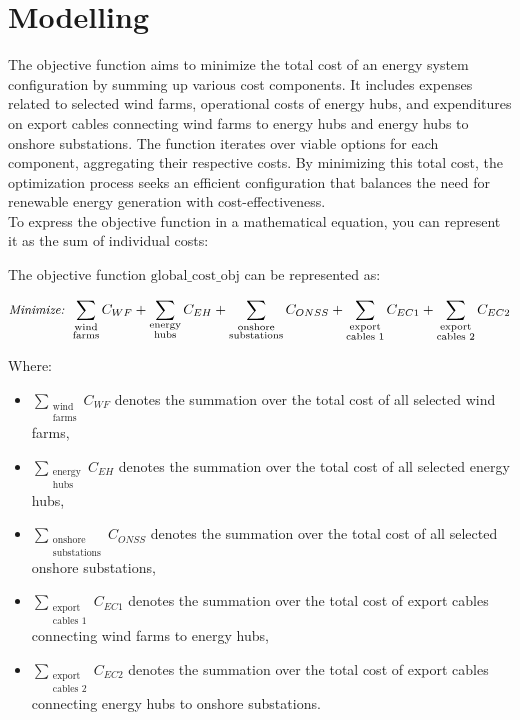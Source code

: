 \chapter{Modelling}

The objective function aims to minimize the total cost of an energy system configuration by summing up various cost components. It includes expenses related to selected wind farms, operational costs of energy hubs, and expenditures on export cables connecting wind farms to energy hubs and energy hubs to onshore substations. The function iterates over viable options for each component, aggregating their respective costs. By minimizing this total cost, the optimization process seeks an efficient configuration that balances the need for renewable energy generation with cost-effectiveness. \\


To express the objective function in a mathematical equation, you can represent it as the sum of individual costs:

The objective function \( \text{global\_cost\_obj} \) can be represented as:

\begin{equation}
\label{eq:objective_function}
\text{\small \emph{Minimize:} } \sum_{\substack{\text{wind} \\ \text{farms}}} C_{WF} + 
\sum_{\substack{\text{energy} \\ \text{hubs}}} C_{EH} + 
\sum_{\substack{\text{onshore} \\ \text{substations}}} C_{ONSS} +
\sum_{\substack{\text{export} \\ \text{cables 1}}} C_{EC1} + 
\sum_{\substack{\text{export} \\ \text{cables 2}}} C_{EC2}
\end{equation}


Where:
\begin{itemize}
    \item \( \sum_{\substack{\text{wind} \\ \text{farms}}} C_{WF} \) denotes the summation over the total cost of all selected wind farms,
    \item \( \sum_{\substack{\text{energy} \\ \text{hubs}}} C_{EH} \) denotes the summation over the total cost of all selected energy hubs,
    \item \( \sum_{\substack{\text{onshore} \\ \text{substations}}} C_{ONSS} \) denotes the summation over the total cost of all selected onshore substations,
    \item \( \sum_{\substack{\text{export} \\ \text{cables 1}}} C_{EC1} \) denotes the summation over the total cost of export cables connecting wind farms to energy hubs,
    \item \( \sum_{\substack{\text{export} \\ \text{cables 2}}} C_{EC2} \) denotes the summation over the total cost of export cables connecting energy hubs to onshore substations.
\end{itemize}
